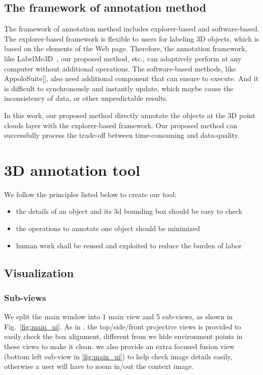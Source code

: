 \documentclass[letterpaper, 10 pt, conference]{ieeeconf}  %
\begin{document}
\subsection{The framework of annotation method}
The framework of annotation method includes explorer-based and software-based. The explorer-based framework is flexible to users for labeling 3D objects, which is based on the elements of the Web page. Therefore, the annotation framework, like LabelMe3D~\cite{LabelMe3D}, our proposed method, etc., can adaptively perform at any computer without additional operations. The software-based methods, like AppoloSuite[], also need additional component that can ensure to execute. And it is difficult to synchronously and instantly update, which maybe cause the inconsistency of data, or other unpredictable results.

In this work, our proposed method directly annotate the objects at the 3D point clouds layer with the explorer-based framework. Our proposed method can successfully process the trade-off between time-consuming and data-quality.
\section{3D annotation tool}
\label{3D annotation tool}

We follow the principles listed below to create our tool:

\begin{itemize}
	\item the details of an object and its 3d bounding box should be easy to check
	\item the operations to annotate one object should be minimized
	\item human work shall be reused and exploited to reduce the burden of labor
\end{itemize}

\subsection{Visualization}

\subsubsection{Sub-views}
We split the main window into 1 main view and 5 sub-views, as shown in Fig.~\ref{fig:main_ui}. As in \cite{Zimmer20193DBA, more..}, the top/side/front projective views is provided to easily check the box alignment, different from \cite{Zimmer20193DBA} we hide environment points in these views to make it clean. we also provide an extra focused fusion view (bottom left sub-view in \ref{fig:main_ui}) to help check image details easily, otherwise a user will have to zoom in/out the context image.
\end{document}
